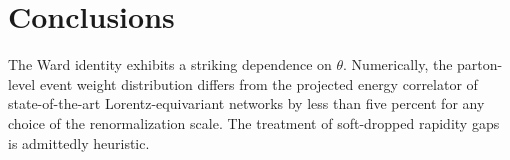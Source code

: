 \section{Conclusions}\label{sec:conclusions}

The Ward identity exhibits a striking dependence on $\theta$.
Numerically, the parton-level event weight distribution differs from the
projected energy correlator of state-of-the-art Lorentz-equivariant
networks by less than five percent for any choice of the renormalization
scale. The treatment of soft-dropped rapidity gaps is admittedly
heuristic.

